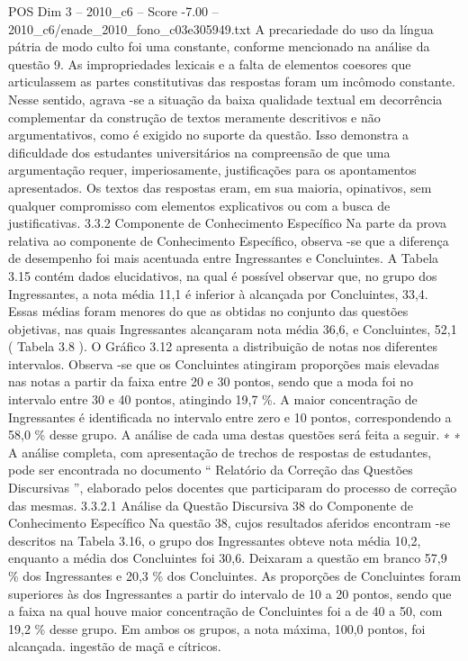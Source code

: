\begin{textsample}{POS Dim 3 – 2010\_c6 – Score -7.00 – 2010\_c6/enade\_2010\_fono\_c03e305949.txt}
A precariedade do uso da língua pátria de modo culto foi uma constante, conforme mencionado na análise da questão 9.
As impropriedades lexicais e a falta de elementos coesores que articulassem as partes constitutivas das respostas foram um incômodo constante.
Nesse sentido, agrava -se a situação da baixa qualidade textual em decorrência complementar da construção de textos meramente descritivos e não argumentativos, como é exigido no suporte da questão.
Isso demonstra a dificuldade dos estudantes universitários na compreensão de que uma argumentação requer, imperiosamente, justificações para os apontamentos apresentados.
Os textos das respostas eram, em sua maioria, opinativos, sem qualquer compromisso com elementos explicativos ou com a busca de justificativas. 3.3.2 Componente de Conhecimento Específico Na parte da prova relativa ao componente de Conhecimento Específico, observa -se que a diferença de desempenho foi mais acentuada entre Ingressantes e Concluintes.
A Tabela 3.15 contém dados elucidativos, na qual é possível observar que, no grupo dos Ingressantes, a nota média 11,1 é inferior à alcançada por Concluintes, 33,4.
Essas médias foram menores do que as obtidas no conjunto das questões objetivas, nas quais Ingressantes alcançaram nota média 36,6, e Concluintes, 52,1 ( Tabela 3.8 ).
O Gráfico 3.12 apresenta a distribuição de notas nos diferentes intervalos.
Observa -se que os Concluintes atingiram proporções mais elevadas nas notas a partir da faixa entre 20 e 30 pontos, sendo que a moda foi no intervalo entre 30 e 40 pontos, atingindo 19,7 \%.
A maior concentração de Ingressantes é identificada no intervalo entre zero e 10 pontos, correspondendo a 58,0 \% desse grupo.
A análise de cada uma destas questões será feita a seguir. ∗ ∗ A análise completa, com apresentação de trechos de respostas de estudantes, pode ser encontrada no documento “ Relatório da Correção das Questões Discursivas ”, elaborado pelos docentes que participaram do processo de correção das mesmas. 3.3.2.1 Análise da Questão Discursiva 38 do Componente de Conhecimento Específico Na questão 38, cujos resultados aferidos encontram -se descritos na Tabela 3.16, o grupo dos Ingressantes obteve nota média 10,2, enquanto a média dos Concluintes foi 30,6.
Deixaram a questão em branco 57,9 \% dos Ingressantes e 20,3 \% dos Concluintes.
As proporções de Concluintes foram superiores às dos Ingressantes a partir do intervalo de 10 a 20 pontos, sendo que a faixa na qual houve maior concentração de Concluintes foi a de 40 a 50, com 19,2 \% desse grupo.
Em ambos os grupos, a nota máxima, 100,0 pontos, foi alcançada. ingestão de maçã e cítricos.

\end{textsample}

